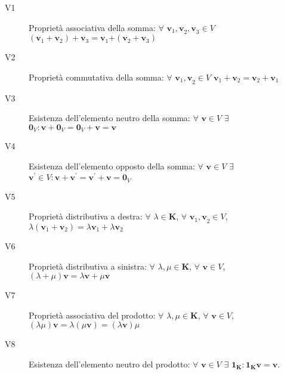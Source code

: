 \documentclass{article}
\begin{document}
\begin{description}
\item[V1] Propriet\`{a} associativa della somma: $\forall $ $\mathbf{v}_{1}%
\mathbf{,v}_{2}\mathbf{,v}_{3}\in V$ $\left( \mathbf{v}_{1}+\mathbf{v}%
_{2}\right) +\mathbf{v}_{3}=\mathbf{v}_{1}\mathbf{+}\left( \mathbf{v}_{2}+%
\mathbf{v}_{3}\right) $

\item[V2] Propriet\`{a} commutativa della somma: $\forall $ $\mathbf{v}_{1}%
\mathbf{,v}_{2}\in V$ $\mathbf{v}_{1}+\mathbf{v}_{2}=\mathbf{v}_{2}+\mathbf{v%
}_{1}$

\item[V3] Esistenza dell'elemento neutro della somma: $\forall $ $\mathbf{v}%
\in V$ $\exists $ $\mathbf{0}_{V}:\mathbf{v}+\mathbf{0}_{V}=\mathbf{0}_{V}+%
\mathbf{v}=\mathbf{v}$

\item[V4] Esistenza dell'elemento opposto della somma: $\forall $ $\mathbf{v}%
\in V$ $\exists $ $\mathbf{v}^{\prime }\in V:\mathbf{v+v}^{\prime }\mathbf{=v%
}^{\prime }+\mathbf{v}=\mathbf{0}_{V}$

\item[V5] Propriet\`{a} distributiva a destra: $\forall $ $\lambda \in 
\mathbf{K}$, $\forall $ $\mathbf{v}_{1}\mathbf{,v}_{2}\in V$, $\lambda
\left( \mathbf{v}_{1}+\mathbf{v}_{2}\right) =\lambda \mathbf{v}_{1}+\lambda 
\mathbf{v}_{2}$

\item[V6] Propriet\`{a} distributiva a sinistra: $\forall $ $\lambda ,\mu
\in \mathbf{K}$, $\forall $ $\mathbf{v}\in V$, $\left( \lambda +\mu \right) 
\mathbf{v}=\lambda \mathbf{v}+\mu \mathbf{v}$

\item[V7] Propriet\`{a} associativa del prodotto: $\forall $ $\lambda ,\mu
\in \mathbf{K}$, $\forall $ $\mathbf{v}\in V$, $\left( \lambda \mu \right) 
\mathbf{v}=\lambda \left( \mu \mathbf{v}\right) =\left( \lambda \mathbf{v}%
\right) \mu $

\item[V8] Esistenza dell'elemento neutro del prodotto: $\forall $ $\mathbf{v}%
\in V$ $\exists $ $\mathbf{1}_{\mathbf{K}}:\mathbf{1}_{\mathbf{K}}\mathbf{v}=%
\mathbf{v}$.
\end{description}
\end{document}

